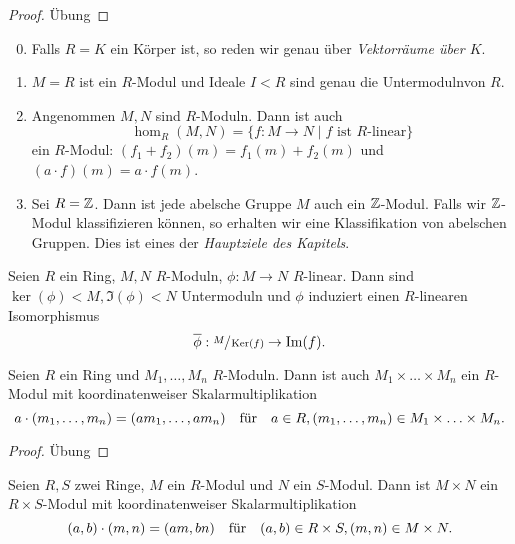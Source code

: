 \begin{proof}
	Übung
\end{proof}

\begin{eg}
	\begin{enumerate}
		\setcounter{enumi}{-1}
		\item Falls $R = K$ ein Körper ist, so reden wir genau über \emph{Vektorräume über $K$}.
		\item $M = R$ ist ein $R$-Modul und Ideale $I < R$ sind genau die Untermodulnvon $R$.
		\item Angenommen $M,N$ sind $R$-Moduln. Dann ist auch
			\[
				\hom_{R}(M,N) = \{f: M \to N \mid f \text{ ist $R$-linear}\} 
			\]
			ein $R$-Modul: $(f_1+f_2)(m) = f_1(m) + f_2(m)$ und $(a\cdot f)(m) = a \cdot f(m)$.
		\item Sei $R = \mathbb{Z}$. Dann ist jede abelsche Gruppe $M$ auch ein $\mathbb{Z}$-Modul.
			Falls wir $\mathbb{Z}$-Modul klassifizieren können, so erhalten wir eine Klassifikation von abelschen Gruppen.
			Dies ist eines der \emph{Hauptziele des Kapitels}.
	\end{enumerate}
\end{eg}

\begin{proposition}
	Seien $R$ ein Ring, $M,N$ $R$-Moduln, $\phi: M \to N$ $R$-linear.
	Dann sind $\ker(\phi) < M, \Im(\phi) < N$ Untermoduln und $\phi$ induziert einen $R$-linearen Isomorphismus
	\[
		\overline{\phi}: \sfrac{M}{\operatorname{Ker}(f)} \to \Im(f)
	.\] 
\end{proposition}

\begin{lemma}
	Seien $R$ ein Ring und $M_1,\ldots,M_{n}$ $R$-Moduln.
	Dann ist auch $M_1 \times \ldots \times M_{n}$ ein $R$-Modul mit koordinatenweiser Skalarmultiplikation
	\[
		a \cdot (m_1,\ldots,m_{n}) = (a m_1,\ldots,a m_{n}) \qq{für} a \in R, (m_1,\ldots,m_{n}) \in M_1 \times \ldots \times M_{n}
	.\] 
\end{lemma}

\begin{proof}
	Übung
\end{proof}

\begin{lemma}
	Seien $R,S$ zwei Ringe, $M$ ein $R$-Modul und $N$ ein $S$-Modul.
	Dann ist $M \times N$ ein $R \times S$-Modul mit koordinatenweiser Skalarmultiplikation
	\[
		(a,b) \cdot (m,n) = (a m, b n) \qq{für} (a,b) \in R \times S, (m,n) \in M \times N
	.\] 
\end{lemma}

